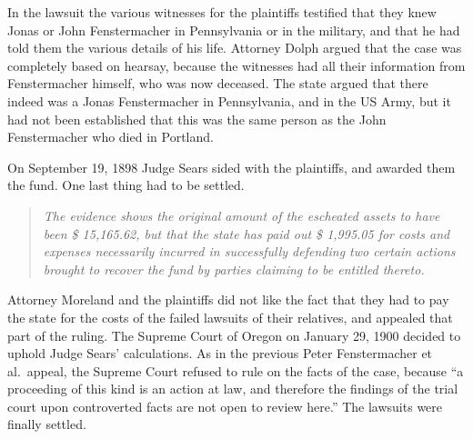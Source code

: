 \documentclass[
  12pt,
]{book}
\begin{document}
In the lawsuit the various witnesses for the plaintiffs testified that they knew Jonas or John Fenstermacher in Pennsylvania or in the military, and that he had told them the various details of his life. Attorney Dolph argued that the case was completely based on hearsay, because the witnesses had all their information from Fenstermacher himself, who was now deceased. The state argued that there indeed was a Jonas Fenstermacher in Pennsylvania, and in the US Army, but it had not been established that this was the same person as the John Fenstermacher who died in Portland.

On September 19, 1898 Judge Sears sided with the plaintiffs, and awarded them the fund. One last thing had to be settled.

\begin{quote}
\emph{The evidence shows the original amount of the escheated assets to have been \$ 15,165.62, but that the state has paid out \$ 1,995.05 for costs and expenses necessarily incurred in successfully defending two certain actions brought to recover the fund by parties claiming to be entitled thereto.}
\end{quote}

Attorney Moreland and the plaintiffs did not like the fact that they had to pay the state for the costs of the failed lawsuits of their relatives, and appealed that part of the ruling. The Supreme Court of Oregon on January 29, 1900 decided to uphold Judge Sears' calculations. As in the previous Peter Fenstermacher et al.~appeal, the Supreme Court refused to rule on the facts of the case, because ``a proceeding of this kind is an action at law, and therefore the findings of the trial court upon controverted facts are not open to review here.'' The lawsuits were finally settled.
\end{document}
